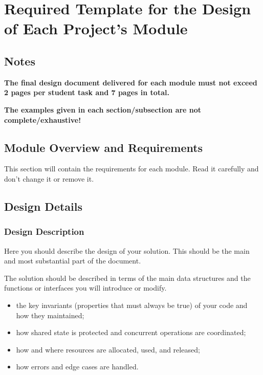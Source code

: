\chapter{Required Template for the Design of Each Project's Module}

\newcommand{\taskA}{\textit{Task A}}
\newcommand{\taskB}{\textit{Task B}}
\newcommand{\taskC}{\textit{Task C}}

\section*{Notes}

\textbf{The final design document delivered for each module must not exceed 2 pages per student task and 7 pages in total.}

\textbf{The examples given in each section/subsection are not complete/exhaustive!}

\section{Module Overview and Requirements}

This section will contain the requirements for each module. Read it carefully and don't change it or remove it.

\section{Design Details}

\subsection{Design Description}

Here you should describe the design of your solution. This should be the main and most substantial part of the document.

The solution should be described in terms of the main data structures and the functions or interfaces you will introduce or modify.

\begin{itemize}
    \item the key invariants (properties that must always be true) of your code and how they maintained;
    \item how shared state is protected and concurrent operations are coordinated;
    \item how and where resources are allocated, used, and released;
    \item how errors and edge cases are handled.
\end{itemize}

